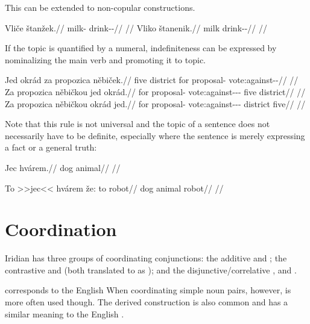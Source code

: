 This can be extended to non-copular constructions.

\begin{multicols}{2}
  \pex
  \a
  \begingl
  \gla Vliče štanžek.//
  \glb milk-\Gen{} drink-\Av{}-\Pf{}//
  \glft {}//
  \endgl
  \a
  \begingl
  \gla Vliko štanenik.//
  \glb milk drink-\Pv{}-\Pf{}//
  \glft {}//
  \endgl
  \xe
\end{multicols}

If the topic is quantified by a numeral,
indefiniteness can be expressed by nominalizing the main
verb and promoting it to topic.

\pex
\a
\begingl
\gla Jed okrád za propozica něbiček.//
\glb five district for proposal-\Acc{} vote:against-\Av{}-\Pf{}//
\glft {}//
\endgl
\a
\begingl
\gla Za propozica něbičkou jed okrád.// \glb for proposal-\Acc{}
vote:against-\Av{}-\Pf{}-\Nz{} five district// \glft {}//
\endgl
\a
\begingl
\gla Za propozica něbičkou okrád jed.// \glb for proposal-\Acc{}
vote:against-\Av{}-\Pf{}-\Nz{}  district five// \glft {}//
\endgl
\xe

Note that this rule is not universal and the topic of a sentence does not necessarily have to be definite, especially where the sentence is merely expressing a fact or a general truth:

\pex
\begingl
\gla Jec hvárem.//
\glb dog animal//
\glft {}//
\endgl
\xe



\pex
\begingl
\gla To >>jec<< hvárem že: to robot//
\glb \Dem{} dog animal \N{}\Cop{} \Dem{} robot//
\glft {}//
\endgl
\xe


\section{Coordination}\label{sec:coordination}

Iridian has three groups of coordinating conjunctions: the additive
 and ; the contrastive  and  (both
translated to  as ); and the
disjunctive/correlative ,  and .

 corresponds to the English  When coordinating simple noun
pairs, however,  is more often used though. The derived construction
 is also common and has a similar meaning to the English .

